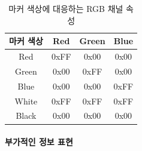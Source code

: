 \documentclass[chapter,11pt,oneside,openany]{xoblivoir}
\begin{document}
\begin{table}[ht]
\centering
\begin{tabular}{c|c|c|c} \hline
마커 색상	& Red	& Green	& Blue	\\ \hline\hline
Red		& 0xFF	& 0x00	& 0x00	\\		
Green	& 0x00	& 0xFF	& 0x00	\\
Blue		& 0x00	& 0x00	& 0xFF	\\
White	& 0xFF	& 0xFF	& 0xFF	\\
Black	& 0x00	& 0x00	& 0x00	\\ \hline

\end{tabular}
\caption{마커 색상에 대응하는 RGB 채널 속성}
\label{table:color}
\end{table}


\paragraph{부가적인 정보 표현}
\label{markerAdd}
\end{document}
